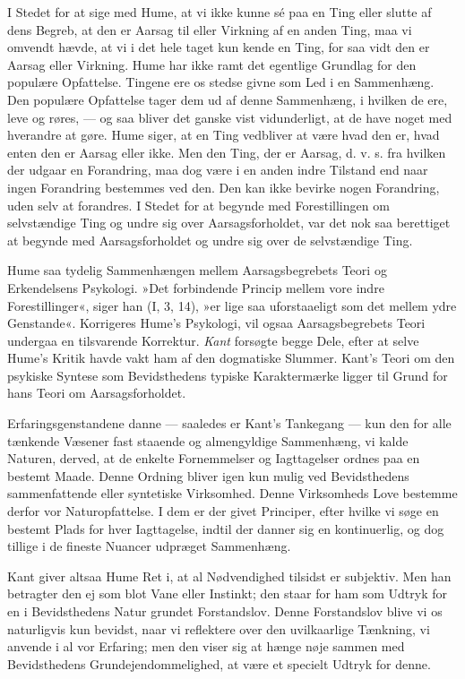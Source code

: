 \documentclass[12pt,a4paper,openany]{book}
\newcommand{\opage}[1]{\marginnote{\footnotesize\textit{[#1]}}}
\begin{document}
I Stedet for at sige med Hume, at vi ikke kunne sé paa en Ting eller
slutte af dens Begreb, at den er Aarsag til eller Virkning af en anden
Ting, maa vi omvendt hævde, at vi i det hele taget kun kende en Ting,
for saa vidt den er Aarsag eller Virkning. Hume har ikke ramt det
egentlige Grundlag for den populære Opfattelse. Tingene ere os stedse
givne som Led i en Sammenhæng. Den populære Opfattelse tager dem ud af
denne Sammenhæng, i hvilken de ere, leve og røres, --- og saa bliver det
ganske vist vidunderligt, at de have noget med hverandre at gøre. Hume
siger, at en Ting vedbliver at være hvad den er, hvad enten den er
Aarsag eller ikke. Men den Ting, der er Aarsag, d. v. s. fra hvilken der
udgaar en Forandring, maa dog være i en anden indre Tilstand end naar
ingen Forandring bestemmes ved den. Den kan ikke bevirke
\opage{257}nogen Forandring, uden selv at forandres. I Stedet for at
begynde med Forestillingen om selvstændige Ting og undre sig over
Aarsagsforholdet, var det nok saa berettiget at begynde med
Aarsagsforholdet og undre sig over de selvstændige Ting.

Hume saa tydelig Sammenhængen mellem Aarsagsbegrebets Teori og
Erkendelsens Psykologi. »Det forbindende Princip mellem vore indre
Forestillinger«, siger han (I, 3, 14), »er lige saa uforstaaeligt som
det mellem ydre Genstande«. Korrigeres Hume’s Psykologi, vil ogsaa
Aarsagsbegrebets Teori undergaa en tilsvarende Korrektur. \emph{Kant}
forsøgte begge Dele, efter at selve Hume’s Kritik havde vakt ham af den
dogmatiske Slummer. Kant’s Teori om den psykiske Syntese som
Bevidsthedens typiske Karaktermærke ligger til Grund for hans Teori om
Aarsagsforholdet.

Erfaringsgenstandene danne --- saaledes er Kant’s Tankegang --- kun den
for alle tænkende Væsener fast staaende og almengyldige Sammenhæng, vi
kalde Naturen, derved, at de enkelte Fornemmelser og Iagttagelser ordnes
paa en bestemt Maade. Denne Ordning bliver igen kun mulig ved
Bevidsthedens sammenfattende eller syntetiske Virksomhed. Denne
Virksomheds Love bestemme derfor vor Naturopfattelse. I dem er der givet
Principer, efter hvilke vi søge en bestemt Plads for hver Iagttagelse,
indtil der danner sig en kontinuerlig, og dog tillige i de fineste
Nuancer udpræget Sammenhæng.

Kant giver altsaa Hume Ret i, at al Nødvendighed tilsidst er subjektiv.
Men han betragter den ej som blot Vane eller Instinkt; den staar for ham
som Udtryk for en i Bevidsthedens Natur grundet Forstandslov. Denne
Forstandslov blive vi os naturligvis kun bevidst, naar vi reflektere
over den uvilkaarlige Tænkning, vi anvende i al vor Erfaring; men den
viser sig at hænge nøje sammen med Bevidsthedens Grundejendommelighed,
at være et specielt Udtryk for denne.
\end{document}
